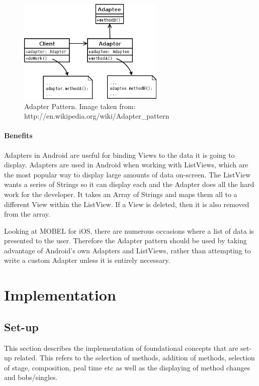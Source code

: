 \documentclass{l4proj}
\begin{document}
\begin{figure}
\centering
\includegraphics[height=5cm]{ObjectAdapter.png}
\caption{Adapter Pattern.  Image taken from: http://en.wikipedia.org/wiki/Adapter\_pattern}
\label{Adapter}
\end{figure}

\subsubsection{Benefits}
Adapters in Android are useful for binding Views to the data it is going to display.  Adapters are used in Android when working with ListViews, which are the most popular way to display large amounts of data on-screen. The ListView wants a series of Strings so it can display each and the Adapter does all the hard work for the developer. It takes an Array of Strings and maps them all to a different View within the ListView.  If a View is deleted, then it is also removed from the array.

Looking at MOBEL for iOS, there are numerous occasions where a list of data is presented to the user.  Therefore the Adapter pattern should be used by taking advantage of Android's own Adapters and ListViews, rather than attempting to write a custom Adapter unless it is entirely necessary. 

\chapter{Implementation}

\section{Set-up}

This section describes the implementation of foundational concepts that are set-up related.  This refers to the selection of methods, addition of methods, selection of stage, composition, peal time etc as well as the displaying of method changes and bobs/singles.
\end{document}
